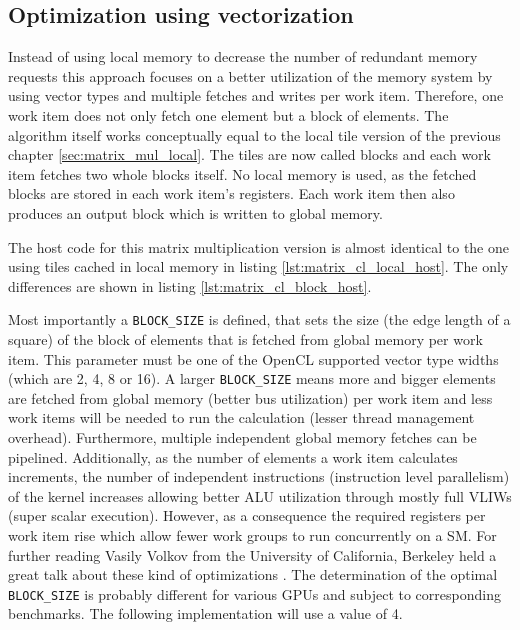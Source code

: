 \subsection{Optimization using vectorization}
\label{sec:matrix_mul_vec}
Instead of using local memory to decrease the number of redundant memory requests this approach focuses on a better utilization of the memory system by using vector types and multiple fetches and writes per work item. Therefore, one work item does not only fetch one element but a block of elements.
The algorithm itself works conceptually equal to the local tile version of the previous chapter \ref{sec:matrix_mul_local}. The tiles are now called blocks and each work item fetches two whole blocks itself. No local memory is used, as the fetched blocks are stored in each work item's registers. Each work item then also produces an output block which is written to global memory.

The host code for this matrix multiplication version is almost identical to the one using tiles cached in local memory in listing \ref{lst:matrix_cl_local_host}. The only differences are shown in listing \ref{lst:matrix_cl_block_host}.



Most importantly a \lstinline!BLOCK_SIZE! is defined, that sets the size (the edge length of a square) of the block of elements that is fetched from global memory per work item. This parameter must be one of the OpenCL supported vector type widths (which are 2, 4, 8 or 16). A larger \lstinline!BLOCK_SIZE! means more and bigger elements are fetched from global memory (better bus utilization) per work item and less work items will be needed to run the calculation (lesser thread management overhead). Furthermore, multiple independent global memory fetches can be pipelined. Additionally, as the number of elements a work item calculates increments, the number of independent instructions (instruction level parallelism) of the kernel increases allowing better ALU utilization through mostly full VLIWs (super scalar execution). However, as a consequence the required registers per work item rise which allow fewer work groups to run concurrently on a SM. For further reading Vasily Volkov from the University of California, Berkeley held a great talk about these kind of optimizations \cite{volkov}.
The determination of the optimal \lstinline!BLOCK_SIZE! is probably different for various GPUs and subject to corresponding benchmarks. The following implementation will use a value of 4.
 
